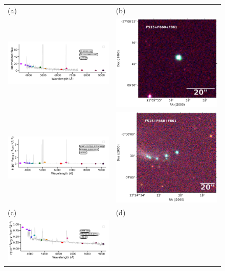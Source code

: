 \documentclass[fleqn,usenatbib]{mnras}
\begin{document}
\begin{figure}
  \setlength\tabcolsep{0pt}
  \begin{tabular}{ll}
    (a) & (b) \\
    \includegraphics[trim=10 0 5 10, clip]{Figs/StenholmAcker_pn_g006_0-41_9_id176-SPLUS-s29s46-072842.pdf}
    & \includegraphics[width=0.2\linewidth, trim=10 0 5 5, clip]{Figs/PNG006_316--37_100_F660-RGB.pdf} \\
    \includegraphics[trim=10 0 5 10, clip]{Figs/spec-0680-52200-0153-STRIPE82-0159-019049.pdf}
    & \includegraphics[width=0.2\linewidth, trim=10 0 5 5, clip]{Figs/GALEX24170_351-0_200_F660-RGB.pdf} \\
    (c) & (d) \\
    \includegraphics[trim=10 0 5 10, clip]{Figs/spec-0376-52143-0631-STRIPE82-0142-027354.pdf}

\end{tabular}
\end{figure}
\end{document}
